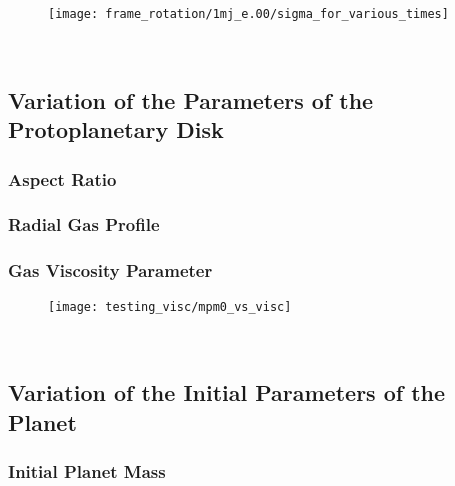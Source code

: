 
\chapter{}

  \section{}

    \begin{figure}[h!]
      \centering
      \texttt{[image: frame\_rotation/1mj\_e.00/sigma\_for\_various\_times]}
      \caption{}
      \label{}
    \end{figure} \ \\ 

  \section{Variation of the Parameters of the Protoplanetary Disk}

    \subsection{Aspect Ratio}

    \subsection{Radial Gas Profile}

    \subsection{Gas Viscosity Parameter}

      \begin{figure}[h!]
        \centering
        \texttt{[image: testing\_visc/mpm0\_vs\_visc]}
        \caption{}
        \label{}
      \end{figure} \ \\ 

  \section{Variation of the Initial Parameters of the Planet}

    \subsection{Initial Planet Mass}

